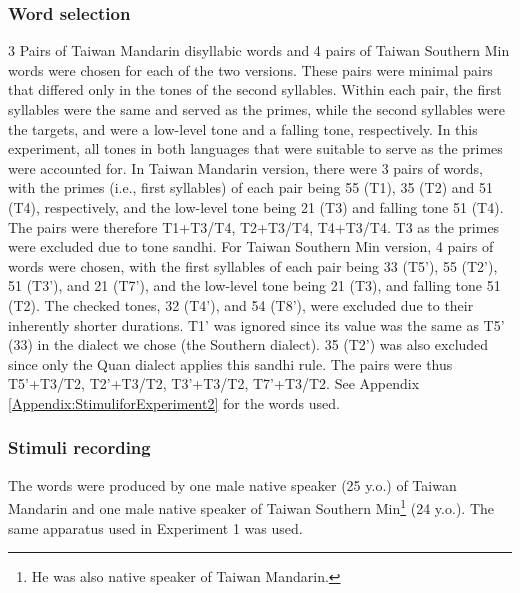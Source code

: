 \subsubsection{Word selection}
3 Pairs of Taiwan Mandarin disyllabic words and 4 pairs of Taiwan Southern Min words were chosen for each of the two versions. These pairs were minimal pairs that differed only in the tones of the second syllables. Within each pair, the first syllables were the same and served as the primes, while the second syllables were the targets, and were a low-level tone and a falling tone, respectively. In this experiment, all tones in both languages that were suitable to serve as the primes were accounted for. In Taiwan Mandarin version, there were 3 pairs of words, with the primes (i.e., first syllables) of each pair being 55 (T1), 35 (T2) and 51 (T4), respectively, and the low-level tone being 21 (T3) and falling tone 51 (T4). The pairs were therefore T1+T3/T4, T2+T3/T4, T4+T3/T4. T3 as the primes were excluded due to tone sandhi. For Taiwan Southern Min version, 4 pairs of words were chosen, with the first syllables of each pair being 33 (T5'), 55 (T2'), 51 (T3'), and 21 (T7'), and the low-level tone being 21 (T3), and falling tone 51 (T2). The checked tones, 32 (T4'), and 54 (T8'), were excluded due to their inherently shorter durations. T1' was ignored since its value was the same as T5' (33) in the dialect we chose (the Southern dialect). 35 (T2') was also excluded since only the Quan dialect applies this sandhi rule. The pairs were thus T5'+T3/T2, T2'+T3/T2, T3'+T3/T2, T7'+T3/T2. See Appendix \ref{Appendix:StimuliforExperiment2} for the words used.

\subsubsection{Stimuli recording}
The words were produced by one male native speaker (25 y.o.) of Taiwan Mandarin and one male native speaker of Taiwan Southern Min\footnote{He was also native speaker of Taiwan Mandarin.} (24 y.o.). The same apparatus used in Experiment 1 was used.


